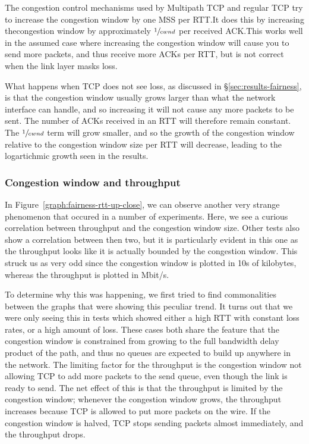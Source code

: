 The congestion control mechanisms used by Multipath TCP and regular TCP try to 
increase the congestion window by one MSS per RTT.\@ It does this by increasing 
thecongestion window by approximately $\sfrac{1}{cwnd}$ per received ACK.\@ This 
works well in the assumed case where increasing the congestion window will cause 
you to send more packets, and thus receive more ACKs per RTT, but is not correct 
when the link layer masks loss.

What happens when TCP does not see loss, as discussed in 
\S\ref{sec:results-fairness}, is %
that the congestion window usually grows larger than what the network interface 
can handle, and so increasing it will not cause any more packets to be sent. 
The number of ACKs received in an RTT will therefore remain constant. The 
$\sfrac{1}{cwnd}$ term will grow smaller, and so the growth of the congestion 
window relative to the congestion window size per RTT will decrease, leading to 
the logartichmic growth seen in the results.

\subsubsection{Congestion window and throughput}

In Figure~\ref{graph:fairness-rtt-up-close}, we can observe another very strange
phenomenon that occured in a number of experiments. Here, we see a curious
correlation between throughput and the congestion window size. Other tests also
show a correlation between then two, but it is particularly evident in this one
as the throughput looks like it is actually bounded by the congestion window.
This struck us as very odd since the congestion window is plotted in 10s of
kilobytes, whereas the throughput is plotted in Mbit/s.

To determine why this was happening, we first tried to find commonalities
between the graphs that were showing this peculiar trend. It turns out that we
were only seeing this in tests which showed either a high RTT with constant loss
rates, or a high amount of loss. These cases both share the feature that the
congestion window is constrained from growing to the full bandwidth delay
product of the path, and thus no queues are expected to build up anywhere in the
network. The limiting factor for the throughput is the congestion window not
allowing TCP to add more packets to the send queue, even though the link is
ready to send. The net effect of this is that the throughput is limited by the
congestion window; whenever the congestion window grows, the throughput
increases because TCP is allowed to put more packets on the wire. If the
congestion window is halved, TCP stops sending packets almost immediately, and
the throughput drops.


